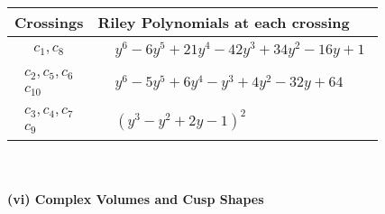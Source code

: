 \documentclass[1p]{elsarticle_modified}
\theoremstyle{definition}
\begin{document}
\begin{tabular}{m{50pt}|m{274pt}}
Crossings & \hspace{64pt}Riley Polynomials at each crossing \\
\hline $$\begin{aligned}c_{1},c_{8}\end{aligned}$$&$\begin{aligned}
&y^6-6 y^5+21 y^4-42 y^3+34 y^2-16 y+1
\end{aligned}$\\
\hline $$\begin{aligned}c_{2},c_{5},c_{6}\\c_{10}\end{aligned}$$&$\begin{aligned}
&y^6-5 y^5+6 y^4- y^3+4 y^2-32 y+64
\end{aligned}$\\
\hline $$\begin{aligned}c_{3},c_{4},c_{7}\\c_{9}\end{aligned}$$&$\begin{aligned}
&(y^3- y^2+2 y-1)^2
\end{aligned}$\\
\hline
\end{tabular}\\~\\
\newpage\flushleft \textbf{(vi) Complex Volumes and Cusp Shapes}
\end{document}
